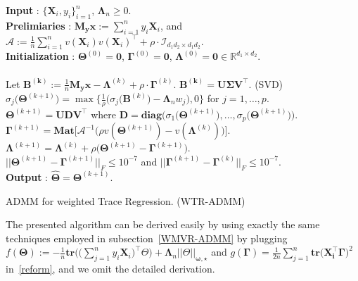 \documentclass[12pt]{article}
\begin{document}
\begin{algorithm}[hbt!] 
    \textbf{Input} : $\big\{\boldsymbol{X}_{i},y_{i}\big\}_{i=1}^{n}$, $\boldsymbol{\Lambda}_{n} \geq 0$. \\
    \textbf{Prelimiaries} : $\boldsymbol{M_{y}x}:=\sum_{i=1}^{n}y_{i}\boldsymbol{X}_{i}$, and
    $\mathcal{A} := \frac{1}{n}\sum_{i=1}^{n} v(\boldsymbol{X}_{i})v(\boldsymbol{X}_{i})^{\top}+\rho\cdot\mathcal{I}_{ d_1d_2 \times d_1d_2}$. \\
    \textbf{Initialization} : $\boldsymbol{\Theta}^{(0)}=\boldsymbol{0}$, $\boldsymbol{\Gamma}^{(0)}=\boldsymbol{0}$, $\boldsymbol{\Lambda}^{(0)}=\boldsymbol{0} \in\mathbb{R}^{d_{1}\times d_{2}}$. \\
     \\
    \qquad {} Let $\boldsymbol{B^{(k)}}:=\frac{1}{n}\boldsymbol{M_{y}x}-\boldsymbol{\Lambda}^{(k)}+\rho \cdot \boldsymbol{\Gamma}^{(k)}$. \quad $\boldsymbol{B^{(k)}}=\boldsymbol{U}\boldsymbol{\Sigma}\boldsymbol{V^{\top}}$. (SVD) \\
    \qquad \qquad \qquad \qquad $\sigma_{j}\big(\boldsymbol{\Theta}^{(k+1)}\big)=\max\bigg\{\frac{1}{\rho}\big(\sigma_{j}(\boldsymbol{B}^{(k)}\big)-\boldsymbol{\Lambda}_{n} w_{j}\big),0 \bigg\}$ for $j=1,\dots,p$. \\
    \qquad \qquad \qquad \qquad $\boldsymbol{\Theta}^{(k+1)} = \boldsymbol{UDV^{\top}}$ where $\boldsymbol{D}=\textbf{diag}\big( \sigma_{1}\big(\boldsymbol{\Theta}^{(k+1)}\big),\dots,\sigma_{p}\big(\boldsymbol{\Theta}^{(k+1)}\big) \big)$.  \\
    \qquad {} 
    $\boldsymbol{\Gamma}^{(k+1)} = \textbf{Mat} \big[\mathcal{A}^{-1}\big(\rho v(\boldsymbol{\Theta}^{(k+1)})-v(\boldsymbol{\Lambda}^{(k)})\big)\big].$\\
    \qquad {} $\boldsymbol{\Lambda}^{(k+1)} = \boldsymbol{\Lambda}^{(k)} + \rho\big( \boldsymbol{\Theta}^{(k+1)}-\boldsymbol{\Gamma}^{(k+1)} \big)$.\\
     $|| \boldsymbol{\Theta}^{(k+1)}-\boldsymbol{\Gamma}^{(k+1)} ||_{F}\leq 10^{-7}$ and $|| \boldsymbol{\Gamma}^{(k+1)}-\boldsymbol{\Gamma}^{(k)} ||_{F}\leq 10^{-7}$. \\
    \textbf{Output} : $\widehat{\boldsymbol{\Theta}}=\boldsymbol{\Theta}^{(k+1)}$. 
    \caption{ADMM for weighted Trace Regression. (WTR-ADMM)}
    \label{trace_algo}
\end{algorithm}

The presented algorithm can be derived easily by using exactly the same techniques employed in subsection~\ref{WMVR-ADMM} by plugging $f(\boldsymbol{\Theta}):=-\frac{1}{n}\textbf{tr}\big( \big(\sum_{j=1}^{n}y_{i}\boldsymbol{X}_{i}\big)^{\top}\Theta \big)+\boldsymbol{\Lambda}_{n}||\Theta||_{\boldsymbol{\omega,\star}}$ and $g(\boldsymbol{\Gamma})=\frac{1}{2n}\sum_{j=1}^{n}\textbf{tr}\big(\boldsymbol{X_i^\top}\boldsymbol{\Gamma}\big)^{2}$ in~\eqref{reform},
and we omit the detailed derivation.
\end{document}
